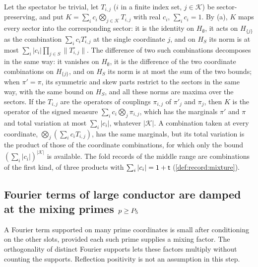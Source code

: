 \begin{remark}\label{rem:signed-mixture-sectors}
Let the spectator be trivial, let $T_{i,j}$ ($i$ in a finite index set,
$j\in\mathcal K$) be sector-preserving, and put
$K=\sum_ic_i\bigotimes_{j\in\mathcal K}T_{i,j}$ with real $c_i$,
$\sum_ic_i=1$. By (a), $K$ maps every sector into the corresponding sector: it
is the identity on $H_\emptyset$, it acts on $H_{\{j\}}$ as the combination
$\sum_ic_iT^\circ_{i,j}$ at the single coordinate $j$, and on $H_S$ its norm is
at most $\sum_i|c_i|\prod_{j\in S}\|T^\circ_{i,j}\|$. The difference of two
such combinations decomposes in the same way: it vanishes on $H_\emptyset$, it
is the difference of the two coordinate combinations on $H_{\{j\}}$, and on
$H_S$ its norm is at most the sum of the two bounds; when $\pi'=\pi$, its
symmetric and skew parts restrict to the sectors in the same way, with the same
bound on $H_S$, and all these norms are maxima over the sectors. If the
$T_{i,j}$ are the operators of couplings $\pi_{i,j}$ of $\pi'_j$ and $\pi_j$,
then $K$ is the operator of the signed measure
$\sum_ic_i\bigotimes_j\pi_{i,j}$, which has the marginals $\pi'$ and $\pi$ and
total variation at most $\sum_i|c_i|$, whatever $|\mathcal K|$. A combination
taken at every coordinate, $\bigotimes_j(\sum_ic_iT_{i,j})$, has the same
marginals, but its total variation is the product of those of the coordinate
combinations, for which only the bound $(\sum_i|c_i|)^{|\mathcal K|}$ is
available. The fold records of the middle range are combinations of the first
kind, of three products with $\sum_i|c_i|=1+\mathsf t$
(\cref{def:record:mixture}).
\end{remark}

\subsection{Fourier terms of large conductor are damped at the mixing primes \texorpdfstring{$p\ge P_5$}{p >= P\_5}}\label{subsec:lifts:decay}

A Fourier term supported on many prime coordinates is small after conditioning
on the other slots, provided each such prime supplies a mixing factor. The
orthogonality of distinct Fourier supports lets these factors multiply without
counting the supports. Reflection positivity is not an assumption in this
step.

